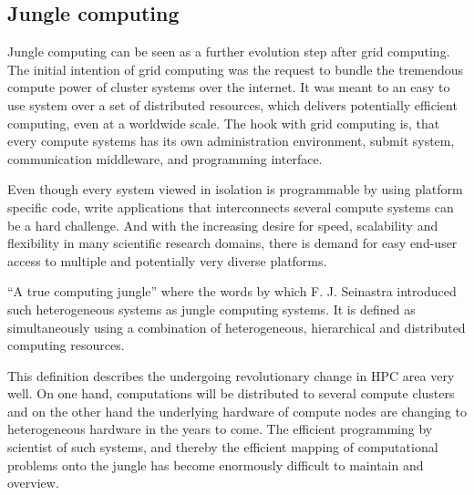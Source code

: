 \subsection{Jungle computing}
\label{sec:jungle}
Jungle computing can be seen as a further evolution step after grid
computing. The initial intention of grid computing was the request to
bundle the tremendous compute power of cluster systems over the
internet\cite{ref:grid}. It was meant to an easy to use system over a
set of distributed resources, which delivers potentially efficient
computing, even at a worldwide scale.  The hook with grid computing
is, that every compute systems has its own administration environment,
submit system, communication middleware, and programming interface.

Even though every system viewed in isolation is programmable by using
platform specific code, write applications that interconnects several
compute systems can be a hard challenge. And with the increasing
desire for speed, scalability and flexibility in many scientific
research domains, there is demand for easy end-user access to multiple
and potentially very diverse platforms.

``A true computing jungle'' where the words by which F. J. Seinastra
introduced such heterogeneous systems as jungle computing
systems\cite{ref:jungle}. It is defined as simultaneously using a
combination of heterogeneous, hierarchical and distributed computing
resources.

This definition describes the undergoing revolutionary change in HPC
area very well. On one hand, computations will be distributed to
several compute clusters and on the other hand the underlying hardware
of compute nodes are changing to heterogeneous hardware in the years
to come. The efficient programming by scientist of such systems, and
thereby the efficient mapping of computational problems onto the
jungle has become enormously difficult to maintain and overview.


